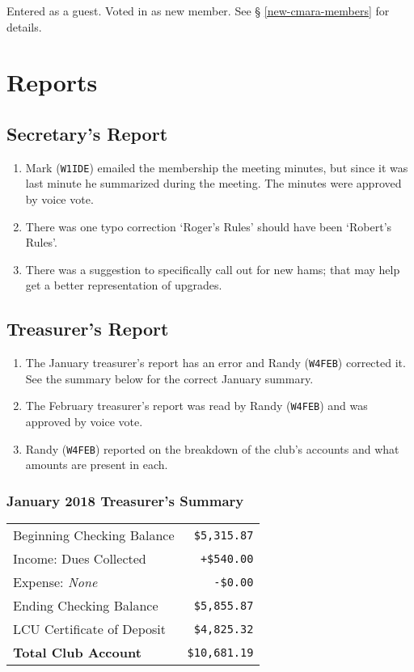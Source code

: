 \documentclass[10pt,letterpaper]{article}
\begin{document}
\noindent
\textasteriskcentered{} Entered as a guest. Voted in as new member. See \S{} \ref{new-cmara-members} for details.

\section{Reports}

\subsection{Secretary's Report}
\begin{enumerate}
  \item Mark (\texttt{W1IDE}) emailed the membership the meeting minutes, but since it was last minute he summarized during the meeting. The minutes were approved by voice vote.
  \item There was one typo correction `Roger's Rules' should have been `Robert's Rules'.
  \item There was a suggestion to specifically call out for new hams; that may help get a better representation of upgrades.
\end{enumerate}

\newpage
\subsection{Treasurer's Report}
\begin{enumerate}
  \item The January treasurer's report has an error and Randy (\texttt{W4FEB}) corrected it.  See the summary below for the correct January summary.
  \item The February treasurer's report was read by Randy (\texttt{W4FEB}) and was approved by voice vote.
  \item Randy (\texttt{W4FEB}) reported on the breakdown of the club's accounts and what amounts are present in each.
\end{enumerate}

\subsubsection{January 2018 Treasurer's Summary}
\noindent
\begin{tabular}{|l|r|}
  \hline
  Beginning Checking Balance & \texttt{\$5,315.87} \\
  Income: Dues Collected & \texttt{+\$540.00} \\
  Expense: \emph{None} & \texttt{-\$0.00} \\
  Ending Checking Balance & \texttt{\$5,855.87} \\
  \hline
  \hline
  LCU Certificate of Deposit & \texttt{\$4,825.32} \\
  \hline
  \hline
  \textbf{Total Club Account} & \texttt{\$10,681.19} \\
  \hline
\end{tabular}
\end{document}
